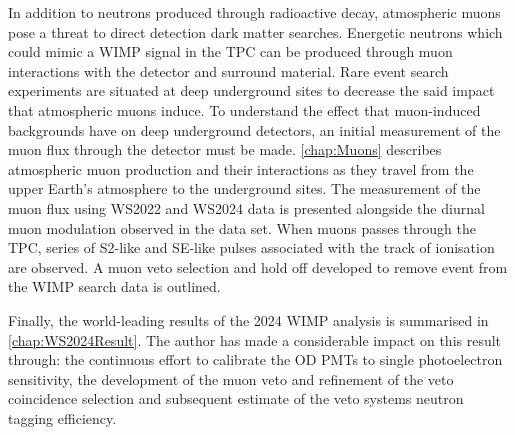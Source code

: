 In addition to neutrons produced through radioactive decay, atmospheric muons pose a threat to direct detection dark matter searches. Energetic neutrons which could mimic a WIMP signal in the TPC can be produced through muon interactions with the detector and surround material. Rare event search experiments are situated at deep underground sites to decrease the said impact that atmospheric muons induce. To understand the effect that muon-induced backgrounds have on deep underground detectors, an initial measurement of the muon flux through the detector must be made. \autoref{chap:Muons} describes atmospheric muon production and their interactions as they travel from the upper Earth's atmosphere to the underground sites. The measurement of the muon flux using WS2022 and WS2024 data is presented alongside the diurnal muon modulation observed in the data set. When muons passes through the TPC, series of S2-like and SE-like pulses associated with the track of ionisation are observed. A muon veto selection and hold off developed to remove event from the WIMP search data is outlined.

Finally, the world-leading results of the 2024 WIMP analysis is summarised in \autoref{chap:WS2024Result}. The author has made a considerable impact on this result through: the continuous effort to calibrate the OD PMTs to single photoelectron sensitivity, the development of the muon veto and refinement of the veto coincidence selection and subsequent estimate of the veto systems neutron tagging efficiency.